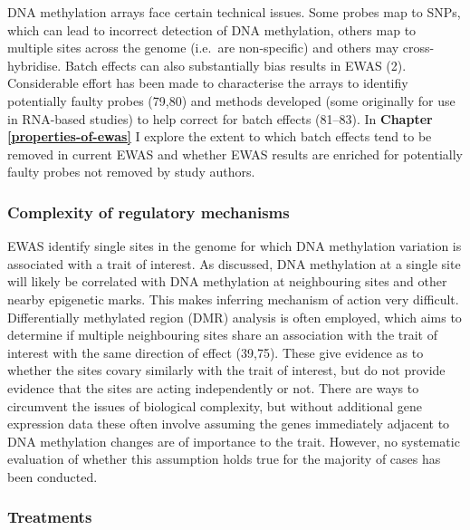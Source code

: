 \documentclass[11pt,oneside]{bristolthesis}
\begin{document}
DNA methylation arrays face certain technical issues. Some probes map to SNPs, which can lead to incorrect detection of DNA methylation, others map to multiple sites across the genome (i.e.~are non-specific) and others may cross-hybridise. Batch effects can also substantially bias results in EWAS (2). Considerable effort has been made to characterise the arrays to identifiy potentially faulty probes (79,80) and methods developed (some originally for use in RNA-based studies) to help correct for batch effects (81--83). In \textbf{Chapter \ref{properties-of-ewas}} I explore the extent to which batch effects tend to be removed in current EWAS and whether EWAS results are enriched for potentially faulty probes not removed by study authors.

\hypertarget{complexity-of-regulatory-mechanisms}{%
\subsubsection{Complexity of regulatory mechanisms}\label{complexity-of-regulatory-mechanisms}}

EWAS identify single sites in the genome for which DNA methylation variation is associated with a trait of interest. As discussed, DNA methylation at a single site will likely be correlated with DNA methylation at neighbouring sites and other nearby epigenetic marks. This makes inferring mechanism of action very difficult. Differentially methylated region (DMR) analysis is often employed, which aims to determine if multiple neighbouring sites share an association with the trait of interest with the same direction of effect (39,75). These give evidence as to whether the sites covary similarly with the trait of interest, but do not provide evidence that the sites are acting independently or not. There are ways to circumvent the issues of biological complexity, but without additional gene expression data these often involve assuming the genes immediately adjacent to DNA methylation changes are of importance to the trait. However, no systematic evaluation of whether this assumption holds true for the majority of cases has been conducted.

\hypertarget{treatments}{%
\subsubsection{Treatments}\label{treatments}}
\end{document}
